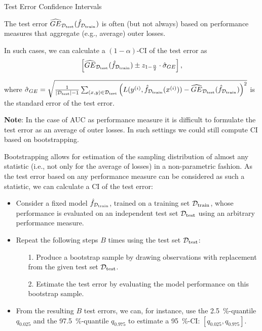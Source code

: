 \begin{vbframe}{Test Error Confidence Intervals}
\begin{itemize}
\end{itemize}

\framebreak

The test error $\widehat{GE}_{\mathcal{D}_{\text{test}}}(\hat{f}_{\mathcal{D}_{\text{train}}})$ is often (but not always) based on performance measures that aggregate (e.g., average) outer losses.

\lz

In such cases, we can calculate a $(1-\alpha)$-CI of the test error as
$$\left[\widehat{GE}_{\mathcal{D}_{\text{test}}}(\hat{f}_{\mathcal{D}_{\text{train}}}) \pm z_{1-\frac{\alpha}{2}} \cdot \hat{\sigma}_{GE} \right],$$

where $\hat{\sigma}_{GE} = \sqrt{\frac{1}{|\mathcal{D}_{\text{test}}|-1} \sum_{(x, y) \in \mathcal{D}_{\text{test}}}\left( L(y^{(i)}, \hat{f}_{\mathcal{D}_{\text{train}}} (x^{(i)})) - \widehat{GE}_{\mathcal{D}_{\text{test}}}(\hat{f}_{\mathcal{D}_{\text{train}}}) \right)^2 }$ is the standard error of the test error.

\lz

\textbf{Note}: In the case of AUC as performance measure it is difficult to formulate the test error as an average of outer losses. In such settings we could still compute CI based on bootstrapping.

\framebreak

Bootstrapping allows for estimation of the sampling distribution of almost any statistic (i.e., not only for the average of losses) in a non-parametric fashion.
As the test error based on any performance measure can be considered as such a statistic, we can calculate a CI of the test error: %

\begin{itemize}
  \item Consider a fixed model $\hat{f}_{\mathcal{D}_{\text{train}}}$, trained on a training set $\mathcal{D}_{\text{train}}$, whose performance is evaluated on an independent test set $\mathcal{D}_{\text{test}}$ using an arbitrary performance measure.
  \item Repeat the following steps $B$ times using the test set $\mathcal{D}_{\text{test}}$:
  \begin{itemize}
  \small
    \item[1.] Produce a bootstrap sample by drawing observations with replacement from the given test set $\mathcal{D}_{\text{test}}$.
    \item[2.] Estimate the test error by evaluating the model performance on this bootstrap sample.
  \normalsize
  \end{itemize}
  \item From the resulting $B$ test errors, we can, for instance, use the 2.5~\%-quantile $q_{0.025}$ and the 97.5~\%-quantile $q_{0.975}$ to estimate a 95~\%-CI:
$\left[q_{0.025}, q_{0.975}\right].$
\end{itemize}

\end{vbframe}


